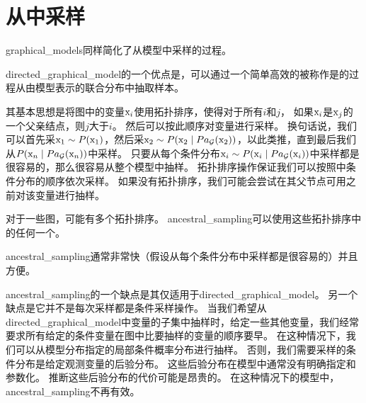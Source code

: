 \section{从中采样}
\label{sec:sampling_from_graphical_models}

\gls{graphical_models}同样简化了从模型中采样的过程。


\gls{directed_graphical_model}的一个优点是，可以通过一个简单高效的被称作是的过程从由模型表示的联合分布中抽取样本。


其基本思想是将图中的变量$\mathrm{x}_i$使用拓扑排序，使得对于所有$i$和$j$，
如果$\mathrm{x}_i$是$\mathrm{x}_j$的一个父亲结点，则$j$大于$i$。
然后可以按此顺序对变量进行采样。
换句话说，我们可以首先采$\mathrm{x}_1\sim P(\mathrm{x}_1)$，然后采$\mathrm{x}_2\sim P(\mathrm{x}_2\mid Pa_{\mathcal{G}}(\mathrm{x}_2))$，以此类推，直到最后我们从$ P(\mathrm{x}_n\mid Pa_{\mathcal{G}}(\mathrm{x}_n))$中采样。
只要从每个条件分布$\mathrm{x}_i\sim P(\mathrm{x}_i\mid Pa_{\mathcal{G}}(\mathrm{x}_i))$中采样都是很容易的，那么很容易从整个模型中抽样。
拓扑排序操作保证我们可以按照中条件分布的顺序依次采样。
如果没有拓扑排序，我们可能会尝试在其父节点可用之前对该变量进行抽样。


对于一些图，可能有多个拓扑排序。 
\gls{ancestral_sampling}可以使用这些拓扑排序中的任何一个。

\gls{ancestral_sampling}通常非常快（假设从每个条件分布中采样都是很容易的）并且方便。


\gls{ancestral_sampling}的一个缺点是其仅适用于\gls{directed_graphical_model}。 
另一个缺点是它并不是每次采样都是条件采样操作。
当我们希望从\gls{directed_graphical_model}中变量的子集中抽样时，给定一些其他变量，我们经常要求所有给定的条件变量在图中比要抽样的变量的顺序要早。
在这种情况下，我们可以从模型分布指定的局部条件概率分布进行抽样。 
否则，我们需要采样的条件分布是给定观测变量的后验分布。
这些后验分布在模型中通常没有明确指定和参数化。 
推断这些后验分布的代价可能是昂贵的。 
在这种情况下的模型中，\gls{ancestral_sampling}不再有效。



